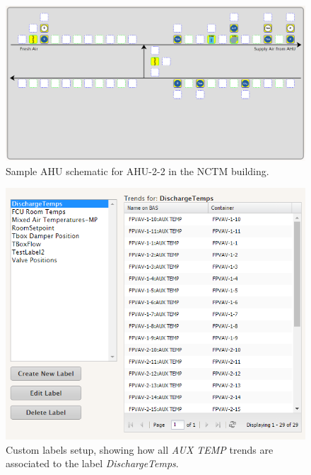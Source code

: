 \begin{figure}
\centering
\includegraphics[scale=0.5]{Images/SampleAHUSchematic.PNG}
\caption{Sample AHU schematic for AHU-2-2 in the NCTM building.}
\label{fig:AHUSchematic}
\end{figure}

\begin{figure}
\centering
\includegraphics[scale=0.75]{Images/CustomLabels.PNG}
\caption{Custom labels setup, showing how all \textit{AUX TEMP} trends
are associated to the label \textit{DischargeTemps}. }
\label{fig:CustomLabels}
\end{figure}

